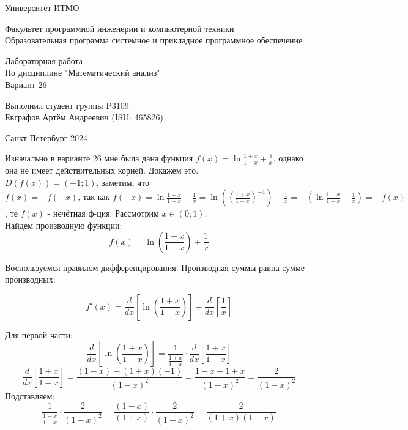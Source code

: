 

\hspace{1cm}
\thispagestyle{empty}
\begin{center}
\LARGE{Университет ИТМО} 
\vspace{20pt}

\LARGE{Факультет программной инженерии и компьютерной техники \\
Образовательная программа системное и прикладное программное обеспечение}
\vspace{160pt}

\LARGE{Лабораторная работа   \\
По дисциплине "Математический анализ" \\ 
Вариант 26}
\vspace{120pt}
\end{center}

\begin{flushright}
\LARGE{Выполнил студент группы P3109 \\ 
Евграфов Артём Андреевич (ISU: 465826)}
\vspace{120pt}
\end{flushright}

\begin{center}
\Large{Санкт-Петербург 2024}
\end{center}

\newpage
\setcounter{page}{1}
\Large
\noindent Изначально в варианте 26 мне была дана функция $f(x)=\ln{\frac{1+x}{1-x}} + \frac{1}{x}$, однако она не имеет действительных корней. Докажем это. \\
$D(f(x))=(-1; 1)$, заметим, что $f(x)=-f(-x)\text{, так как } f(-x)=\ln{\frac{1-x}{1+x}}-\frac{1}{x}=\ln{((\frac{1+x}{1-x})^{-1})} - \frac{1}{x} = -(\ln{\frac{1+x}{1-x}} + \frac{1}{x}) = -f(x)$, те $f(x)$ - нечётная ф-ция. Рассмотрим $x \in (0; 1)$. \\
Найдем производную функции:
\[
f(x) = \ln\left(\frac{1+x}{1-x}\right) + \frac{1}{x}
\]

\noindent Воспользуемся правилом дифференцирования. Производная суммы равна сумме производных:

\[
f'(x) = \frac{d}{dx}\left[\ln\left(\frac{1+x}{1-x}\right)\right] + \frac{d}{dx}\left[\frac{1}{x}\right]
\]

\noindent Для первой части:
\[
\frac{d}{dx}\left[\ln\left(\frac{1+x}{1-x}\right)\right] = \frac{1}{\frac{1+x}{1-x}} \cdot \frac{d}{dx}\left[\frac{1+x}{1-x}\right]
\]
\[
\frac{d}{dx}\left[\frac{1+x}{1-x}\right] = \frac{(1-x) - (1+x)(-1)}{(1-x)^2} = \frac{1-x+1+x}{(1-x)^2} = \frac{2}{(1-x)^2}
\]
Подставляем:
\[
\frac{1}{\frac{1+x}{1-x}} \cdot \frac{2}{(1-x)^2} = \frac{(1-x)}{(1+x)} \cdot \frac{2}{(1-x)^2} = \frac{2}{(1+x)(1-x)}
\]

